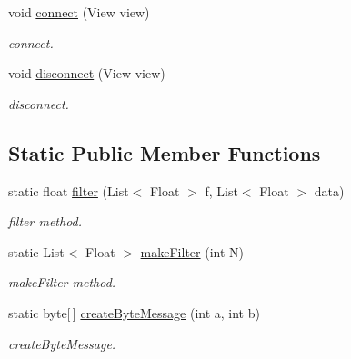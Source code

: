 \begin{DoxyCompactItemize}
\item 
void \hyperlink{classio_1_1github_1_1samshore_1_1clientapp_1_1_main_activity_a2c8391580f8398901d31fd16965acb5e}{connect} (View view)
\begin{DoxyCompactList}\small\item\em connect. \end{DoxyCompactList}\item 
void \hyperlink{classio_1_1github_1_1samshore_1_1clientapp_1_1_main_activity_aea604061da658ca1a50b516ab19fee2a}{disconnect} (View view)
\begin{DoxyCompactList}\small\item\em disconnect. \end{DoxyCompactList}\end{DoxyCompactItemize}
\subsection*{Static Public Member Functions}
\begin{DoxyCompactItemize}
\item 
static float \hyperlink{classio_1_1github_1_1samshore_1_1clientapp_1_1_main_activity_a87db9e050454e4b7ead12a8fe0814eaf}{filter} (List$<$ Float $>$ f, List$<$ Float $>$ data)
\begin{DoxyCompactList}\small\item\em filter method. \end{DoxyCompactList}\item 
static List$<$ Float $>$ \hyperlink{classio_1_1github_1_1samshore_1_1clientapp_1_1_main_activity_afcf53786b487f8afa53b251f9249f9ab}{make\+Filter} (int N)
\begin{DoxyCompactList}\small\item\em make\+Filter method. \end{DoxyCompactList}\item 
static byte\mbox{[}$\,$\mbox{]} \hyperlink{classio_1_1github_1_1samshore_1_1clientapp_1_1_main_activity_a82cb044b58dc6f00f04e2181c1895430}{create\+Byte\+Message} (int a, int b)
\begin{DoxyCompactList}\small\item\em create\+Byte\+Message. \end{DoxyCompactList}\end{DoxyCompactItemize}
